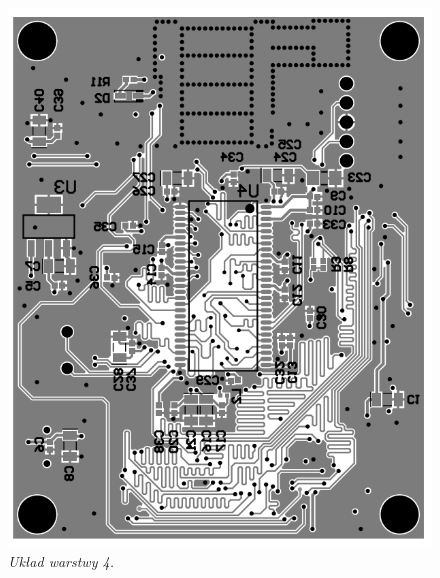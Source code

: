 \documentclass[eng,printmode]{mgr}
\begin{document}
\begin{center}\centering
\begin{figure}[!h]
\vskip 2cm
    \centering
    \includegraphics[width=\textwidth]{pcb/bottom.png}
    \caption{\textit{Układ warstwy 4.}}
\end{figure}
\end{center}
\end{document}
